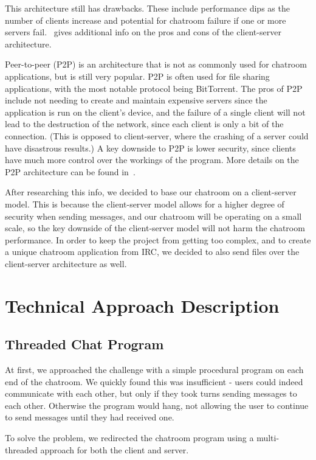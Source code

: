 \documentclass{article}
\begin{document}
This architecture still has drawbacks. These include performance dips as the number of clients increase and potential for chatroom failure if one or more servers fail.~\cite{clientserver} gives additional info on the pros and cons of the client-server architecture.

Peer-to-peer (P2P) is an architecture that is not as commonly used for chatroom applications, but is still very popular. P2P is often used for file sharing applications, with the most notable protocol being BitTorrent. The pros of P2P include not needing to create and maintain expensive servers since the application is run on the client's device, and the failure of a single client will not lead to the destruction of the network, since each client is only a bit of the connection. (This is opposed to client-server, where the crashing of a server could have disastrous results.) A key downside to P2P is lower security, since clients have much more control over the workings of the program. More details on the P2P architecture can be found in~\cite{P2P}.

After researching this info, we decided to base our chatroom on a client-server model. This is because the client-server model allows for a higher degree of security when sending messages, and our chatroom will be operating on a small scale, so the key downside of the client-server model will not harm the chatroom performance. In order to keep the project from getting too complex, and to create a unique chatroom application from IRC, we decided to also send files over the client-server architecture as well.

\section{Technical Approach Description}

\subsection{Threaded Chat Program}

At first, we approached the challenge with a simple procedural program on each end of the chatroom. We quickly found this was insufficient - users could indeed communicate with each other, but only if they took turns sending messages to each other. Otherwise the program would hang, not allowing the user to continue to send messages until they had received one.

To solve the problem, we redirected the chatroom program using a multi-threaded approach for both the client and server.
\end{document}
